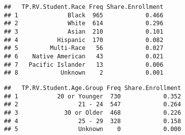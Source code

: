 \documentclass[]{article}
\newenvironment{Shaded}{\begin{snugshade}}{\end{snugshade}}
\newcommand{\KeywordTok}[1]{\textcolor[rgb]{0.13,0.29,0.53}{\textbf{#1}}}
\newcommand{\DataTypeTok}[1]{\textcolor[rgb]{0.13,0.29,0.53}{#1}}
\newcommand{\DecValTok}[1]{\textcolor[rgb]{0.00,0.00,0.81}{#1}}
\newcommand{\StringTok}[1]{\textcolor[rgb]{0.31,0.60,0.02}{#1}}
\newcommand{\OperatorTok}[1]{\textcolor[rgb]{0.81,0.36,0.00}{\textbf{#1}}}
\newcommand{\NormalTok}[1]{#1}
\begin{document}
\begin{verbatim}
##   TP.RV.Student.Race Freq Share.Enrollment
## 1              Black  965            0.466
## 2              White  614            0.296
## 3              Asian  210            0.101
## 4           Hispanic  170            0.082
## 5         Multi-Race   56            0.027
## 6    Native American   43            0.021
## 7   Pacific Islander   13            0.006
## 8            Unknown    2            0.001
\end{verbatim}

\begin{Shaded}
\end{Shaded}

\begin{verbatim}
##   TP.RV.Student.Age.Group Freq Share.Enrollment
## 1           20 or Younger  730            0.352
## 2                 21 - 24  547            0.264
## 3             30 or Older  468            0.226
## 4                 25 - 29  328            0.158
## 5                 Unknown    0            0.000
\end{verbatim}
\end{document}
